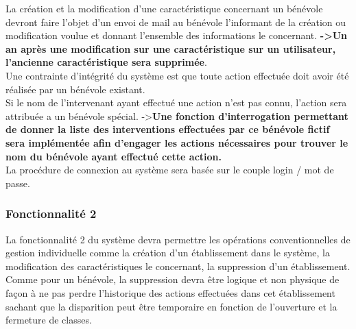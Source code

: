 La création et la modification d'une caractéristique concernant un bénévole devront faire l'objet d'un envoi de mail au bénévole l'informant de la création ou modification voulue et donnant l'ensemble des informations le concernant. 
\textbf{->Un an après une modification sur une caractéristique sur un utilisateur, l'ancienne caractéristique sera supprimée}. \\


Une contrainte d'intégrité du système est que toute action effectuée doit avoir été réalisée par un bénévole existant. \\
Si le nom de l'intervenant ayant effectué une action n'est pas connu, l'action sera attribuée a un bénévole spécial. 
->\textbf{Une fonction d'interrogation permettant de donner la liste des interventions effectuées par ce bénévole fictif sera implémentée afin d'engager les actions nécessaires pour trouver le nom du bénévole ayant effectué cette action.} \\


La procédure de connexion au système sera basée sur le couple login / mot de passe.
\\



\subsubsection{Fonctionnalité 2}
La fonctionnalité 2 du système devra permettre les opérations conventionnelles de gestion individuelle comme la création d'un établissement dans le système, la modification des
caractéristiques le concernant, la suppression d'un établissement. Comme pour un bénévole, la suppression devra être logique et non physique de façon à ne pas perdre l'historique des actions effectuées dans cet établissement sachant que la disparition peut être temporaire en fonction de l'ouverture et la fermeture de classes. \\


